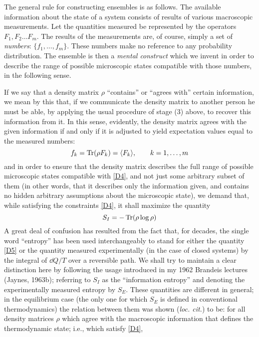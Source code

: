 The general rule for constructing ensembles is as follows.
The available information about the state of a system consists of results of various macroscopic measurements.
Let the quantities measured be represented by the operators $F_1,F_2 \ldots F_m$.
The results of the measurements are, of course, simply a set of \emph{numbers}: $\{f_1, \ldots, f_m\}$.
These numbers make no reference to any probability distribution.
The ensemble is then a \emph{mental construct} which we invent in order to describe the range of possible microscopic states compatible with those numbers, in the following sense.

If we say that a density matrix $\rho$ ``contains'' or ``agrees with'' certain information, we mean by this that, if we communicate the density matrix to another person he must be able, by applying the usual procedure of stage (3) above, to recover this information from it.
In this sense, evidently, the density matrix agrees with the given information if and only if it is adjusted to yield expectation values equal to the measured numbers:
\begin{equation}
	\label{D4}
	f_k = \operatorname{Tr}(\rho F_k) = \langle F_k\rangle, \qquad k = 1,\ldots, m
\end{equation}
and in order to ensure that the density matrix describes the full range of possible microscopic states compatible with \eqref{D4}, and not just some arbitrary subset of them (in other words, that it describes only the information given, and contains no hidden arbitrary assumptions about the microscopic state), we demand that, while satisfying the constraints \eqref{D4}, it shall maximize the quantity
\begin{equation}
	\label{D5}
	S_I = - \operatorname{Tr}(\rho \log \rho)
\end{equation}
A great deal of confusion has resulted from the fact that, for decades, the single word ``entropy'' has been used interchangeably to stand for either the quantity \eqref{D5} or the quantity measured experimentally (in the case of closed systems) by the integral of $\dd Q/T$ over a reversible path.
We shall try to maintain a clear distinction here by following the usage introduced in my 1962 Brandeis lectures (\cite{jaynes63b}{Jaynes, 1963b}); referring to $S_I$ as the ``information entropy'' and denoting the experimentally measured entropy by $S_E$.
These quantities are different in general; in the equilibrium case (the only one for which $S_E$ is defined in conventional thermodynamics) the relation between them was shown (\emph{loc. cit.}) to be: for all density matrices $\rho$ which agree with the macroscopic information that defines the thermodynamic state; i.e., which satisfy \eqref{D4},
